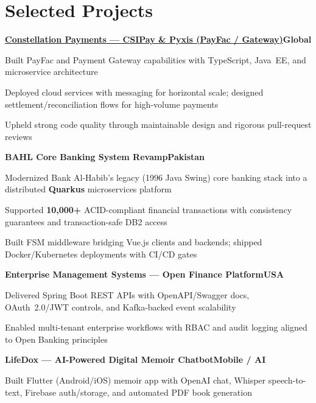 \documentclass[letterpaper,10pt]{article}
\newcommand{\heading}[2]{
  \hspace{8pt}#1\hfill#2\\
}
\newcommand{\headingBf}[2]{
  \heading{\textbf{#1}}{\textbf{#2}}
}
\newenvironment{resume_list}{
  \vspace{-6pt}
  \begin{itemize}[itemsep=-1px, parsep=0.5pt, topsep=1pt, leftmargin=22pt]
}{
  \end{itemize}
  \vspace{-2pt}
}
\begin{document}
\section{Selected Projects}

\headingBf{\href{https://www.constellationpayments.com/}{Constellation Payments --- CSIPay \& Pyxis (PayFac / Gateway)}}{Global}
\begin{resume_list}
  \item Built PayFac and Payment Gateway capabilities with TypeScript, Java~EE, and microservice architecture
  \item Deployed cloud services with messaging for horizontal scale; designed settlement/reconciliation flows for high-volume payments
  \item Upheld strong code quality through maintainable design and rigorous pull-request reviews
\end{resume_list}

\vspace{2pt}
\headingBf{BAHL Core Banking System Revamp}{Pakistan}
\begin{resume_list}
  \item Modernized Bank Al-Habib's legacy (1996 Java Swing) core banking stack into a distributed \textbf{Quarkus} microservices platform
  \item Supported \textbf{10,000+} ACID-compliant financial transactions with consistency guarantees and transaction-safe DB2 access
  \item Built FSM middleware bridging Vue.js clients and backends; shipped Docker/Kubernetes deployments with CI/CD gates
\end{resume_list}

\vspace{2pt}
\headingBf{Enterprise Management Systems --- Open Finance Platform}{USA}
\begin{resume_list}
  \item Delivered Spring Boot REST APIs with OpenAPI/Swagger docs, OAuth~2.0/JWT controls, and Kafka-backed event scalability
  \item Enabled multi-tenant enterprise workflows with RBAC and audit logging aligned to Open Banking principles
\end{resume_list}

\vspace{2pt}
\headingBf{LifeDox --- AI-Powered Digital Memoir Chatbot}{Mobile / AI}
\begin{resume_list}
  \item Built Flutter (Android/iOS) memoir app with OpenAI chat, Whisper speech-to-text, Firebase auth/storage, and automated PDF book generation
\end{resume_list}
\end{document}
